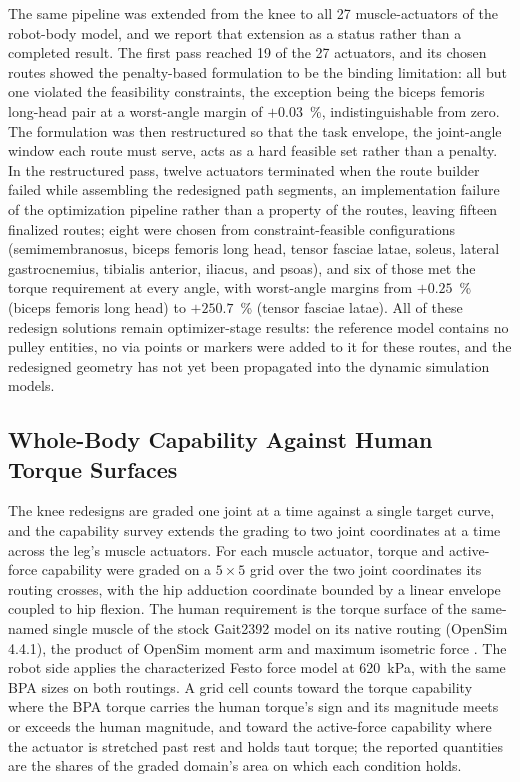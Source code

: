 \documentclass[utf8]{FrontiersinHarvard} %
\begin{document}
The same pipeline was extended from the knee to all 27 muscle-actuators of the robot-body model, and we report that extension as a status rather than a completed result. The first pass reached 19 of the 27 actuators, and its chosen routes showed the penalty-based formulation to be the binding limitation: all but one violated the feasibility constraints, the exception being the biceps femoris long-head pair at a worst-angle margin of $+0.03$~\%, indistinguishable from zero. The formulation was then restructured so that the task envelope, the joint-angle window each route must serve, acts as a hard feasible set rather than a penalty. In the restructured pass, twelve actuators terminated when the route builder failed while assembling the redesigned path segments, an implementation failure of the optimization pipeline rather than a property of the routes, leaving fifteen finalized routes; eight were chosen from constraint-feasible configurations (semimembranosus, biceps femoris long head, tensor fasciae latae, soleus, lateral gastrocnemius, tibialis anterior, iliacus, and psoas), and six of those met the torque requirement at every angle, with worst-angle margins from $+0.25$~\% (biceps femoris long head) to $+250.7$~\% (tensor fasciae latae). All of these redesign solutions remain optimizer-stage results: the reference model contains no pulley entities, no via points or markers were added to it for these routes, and the redesigned geometry has not yet been propagated into the dynamic simulation models.

\subsection{Whole-Body Capability Against Human Torque Surfaces}\label{sec:capability_survey}

The knee redesigns are graded one joint at a time against a single target curve, and the capability survey extends the grading to two joint coordinates at a time across the leg's muscle actuators. For each muscle actuator, torque and active-force capability were graded on a $5 \times 5$ grid over the two joint coordinates its routing crosses, with the hip adduction coordinate bounded by a linear envelope coupled to hip flexion. The human requirement is the torque surface of the same-named single muscle of the stock Gait2392 model on its native routing (OpenSim 4.4.1), the product of OpenSim moment arm and maximum isometric force \citep{delp_opensim_2007, seth_opensim_2018}. The robot side applies the characterized Festo force model \citep{bolen_2026} at \qty{620}{\kPa}, with the same BPA sizes on both routings. A grid cell counts toward the torque capability where the BPA torque carries the human torque's sign and its magnitude meets or exceeds the human magnitude, and toward the active-force capability where the actuator is stretched past rest and holds taut torque; the reported quantities are the shares of the graded domain's area on which each condition holds.
\end{document}
